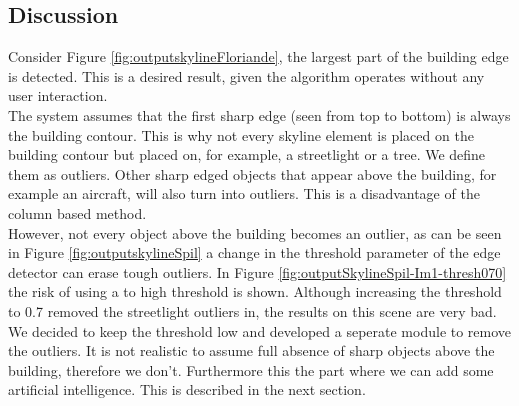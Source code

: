 \pagebreak
{}

\pagebreak
{}

\subsection{Discussion}  %
Consider Figure \ref{fig:outputskylineFloriande}, the largest part of the
building edge is detected. This is a desired result, given the algorithm
operates without any user interaction.\\
The system assumes that the first sharp edge (seen from top to bottom) is always
the building contour. This is why not every skyline element is placed on the building
contour but placed on, for example, a streetlight or a tree. We define them
as outliers. Other sharp edged objects that appear above the building,
for example an aircraft, will also turn into outliers.  This is a disadvantage of the
	column based method.\\
However, not every object above the building becomes an outlier, as can be seen in Figure
\ref{fig:outputskylineSpil} a change in the threshold parameter of the edge
detector can erase tough outliers. 
In Figure \ref{fig:outputSkylineSpil-Im1-thresh070} the risk of using a to high
threshold is shown. Although increasing the threshold to 0.7 removed the
streetlight outliers in, the results on this scene are very bad.\\

We decided to keep the threshold low and developed a seperate module to remove the outliers. It is not realistic to
assume full absence of sharp objects above the building, therefore we don't.
Furthermore this the part where we can add some artificial intelligence. This is
described in the next section.  



